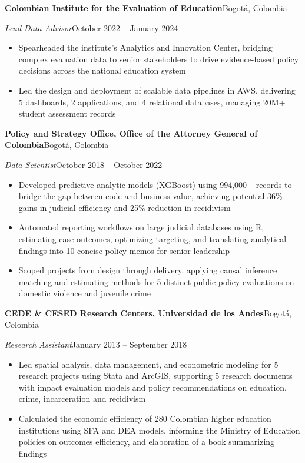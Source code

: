 \documentclass[10pt]{article}
\newcommand{\org}[2]{\noindent\textbf{#1}\hfill #2\par\vspace{0pt}}
\newcommand{\role}[2]{\noindent\textit{#1}\hfill #2\par\vspace{0pt}}
\newenvironment{cvitems}{%
  \begin{itemize}[
    leftmargin=1.2em,
    itemsep=0pt,
    parsep=0pt,
    topsep=1pt,
    label={$\bullet$}]%
}{\end{itemize}}
\newcommand{\entrygap}{\vspace{6pt}}
\begin{document}
\entrygap

\org{Colombian Institute for the Evaluation of Education}{Bogotá, Colombia}
\role{Lead Data Advisor}{October 2022 – January 2024}
\vspace{-1pt}
\begin{cvitems}
  \item Spearheaded the institute’s Analytics and Innovation Center, bridging complex evaluation data to senior stakeholders to drive evidence-based policy decisions across the national education system
  \item Led the design and deployment of scalable data pipelines in AWS, delivering 5 dashboards, 2 applications, and 4 relational databases, managing 20M+ student assessment records
\end{cvitems}

\entrygap

\org{Policy and Strategy Office, Office of the Attorney General of Colombia}{Bogotá, Colombia}
\role{Data Scientist}{October 2018 – October 2022}
\vspace{-1pt}
\begin{cvitems}
  \item Developed predictive analytic models (XGBoost) using 994,000+ records to bridge the gap between code and business value, achieving potential 36\% gains in judicial efficiency and 25\% reduction in recidivism
  \item Automated reporting workflows on large judicial databases using R, estimating case outcomes, optimizing targeting, and translating analytical findings into 10 concise policy memos for senior leadership
  \item Scoped projects from design through delivery, applying causal inference matching and estimating methods for 5 distinct public policy evaluations on domestic violence and juvenile crime
\end{cvitems}

\newpage

\org{CEDE \& CESED Research Centers, Universidad de los Andes}{Bogotá, Colombia}
\role{Research Assistant}{January 2013 – September 2018}
\vspace{-1pt}
\begin{cvitems}
  \item Led spatial analysis, data management, and econometric modeling for 5 research projects using Stata and ArcGIS, supporting 5 research documents with impact evaluation models and policy recommendations on education, crime, incarceration and recidivism
  \item Calculated the economic efficiency of 280 Colombian higher education institutions using SFA and DEA models, informing the Ministry of Education policies on outcomes efficiency, and elaboration of a book summarizing findings
\end{cvitems}
\end{document}
